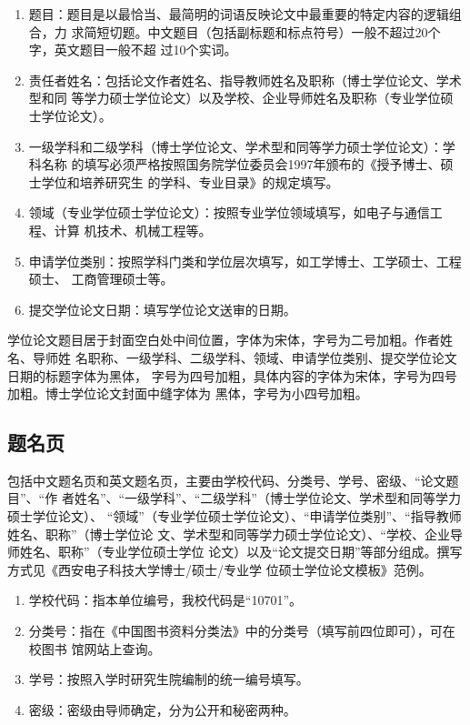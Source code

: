 \begin{enumerate}
\item 题目：题目是以最恰当、最简明的词语反映论文中最重要的特定内容的逻辑组合，力
  求简短切题。中文题目（包括副标题和标点符号）一般不超过20个字，英文题目一般不超
  过10个实词。
\item 责任者姓名：包括论文作者姓名、指导教师姓名及职称（博士学位论文、学术型和同
  等学力硕士学位论文）以及学校、企业导师姓名及职称（专业学位硕士学位论文）。
\item 一级学科和二级学科（博士学位论文、学术型和同等学力硕士学位论文）：学科名称
  的填写必须严格按照国务院学位委员会1997年颁布的《授予博士、硕士学位和培养研究生
  的学科、专业目录》的规定填写。
\item 领域（专业学位硕士学位论文）：按照专业学位领域填写，如电子与通信工程、计算
  机技术、机械工程等。
\item 申请学位类别：按照学科门类和学位层次填写，如工学博士、工学硕士、工程硕士、
  工商管理硕士等。
\item 提交学位论文日期：填写学位论文送审的日期。
\end{enumerate}

学位论文题目居于封面空白处中间位置，字体为宋体，字号为二号加粗。作者姓名、导师姓
名职称、一级学科、二级学科、领域、申请学位类别、提交学位论文日期的标题字体为黑体，
字号为四号加粗，具体内容的字体为宋体，字号为四号加粗。博士学位论文封面中缝字体为
黑体，字号为小四号加粗。

\subsection{题名页}

包括中文题名页和英文题名页，主要由学校代码、分类号、学号、密级、“论文题目”、“作
者姓名”、“一级学科”、“二级学科”（博士学位论文、学术型和同等学力硕士学位论文）、
“领域”（专业学位硕士学位论文）、“申请学位类别”、“指导教师姓名、职称”（博士学位论
文、学术型和同等学力硕士学位论文）、“学校、企业导师姓名、职称”（专业学位硕士学位
论文）以及“论文提交日期”等部分组成。撰写方式见《西安电子科技大学博士/硕士/专业学
位硕士学位论文模板》范例。 

\begin{enumerate}
\item 学校代码：指本单位编号，我校代码是“10701”。
\item 分类号：指在《中国图书资料分类法》中的分类号（填写前四位即可），可在校图书
  馆网站上查询。
\item 学号：按照入学时研究生院编制的统一编号填写。
\item 密级：密级由导师确定，分为公开和秘密两种。
\end{enumerate}

